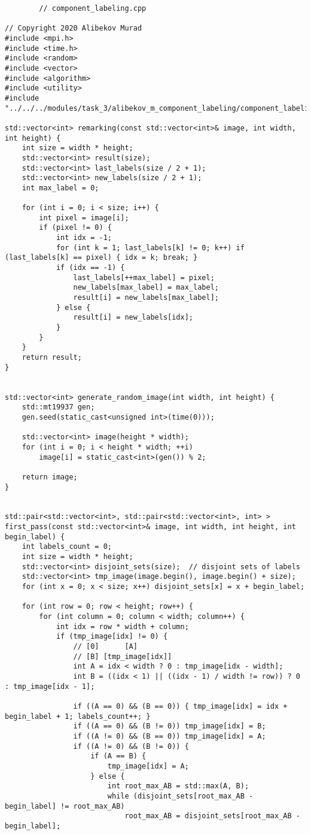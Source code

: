 \documentclass{report}
\begin{document}
	\begin{lstlisting}
		// component_labeling.cpp

// Copyright 2020 Alibekov Murad
#include <mpi.h>
#include <time.h>
#include <random>
#include <vector>
#include <algorithm>
#include <utility>
#include "../../../modules/task_3/alibekov_m_component_labeling/component_labeling.h"

std::vector<int> remarking(const std::vector<int>& image, int width, int height) {
    int size = width * height;
    std::vector<int> result(size);
    std::vector<int> last_labels(size / 2 + 1);
    std::vector<int> new_labels(size / 2 + 1);
    int max_label = 0;

    for (int i = 0; i < size; i++) {
        int pixel = image[i];
        if (pixel != 0) {
            int idx = -1;
            for (int k = 1; last_labels[k] != 0; k++) if (last_labels[k] == pixel) { idx = k; break; }
            if (idx == -1) {
                last_labels[++max_label] = pixel;
                new_labels[max_label] = max_label;
                result[i] = new_labels[max_label];
            } else {
                result[i] = new_labels[idx];
            }
        }
    }
    return result;
}


std::vector<int> generate_random_image(int width, int height) {
    std::mt19937 gen;
    gen.seed(static_cast<unsigned int>(time(0)));

    std::vector<int> image(height * width);
    for (int i = 0; i < height * width; ++i)
        image[i] = static_cast<int>(gen()) % 2;

    return image;
}


std::pair<std::vector<int>, std::pair<std::vector<int>, int> >
first_pass(const std::vector<int>& image, int width, int height, int begin_label) {
    int labels_count = 0;
    int size = width * height;
    std::vector<int> disjoint_sets(size);  // disjoint sets of labels
    std::vector<int> tmp_image(image.begin(), image.begin() + size);
    for (int x = 0; x < size; x++) disjoint_sets[x] = x + begin_label;

    for (int row = 0; row < height; row++) {
        for (int column = 0; column < width; column++) {
            int idx = row * width + column;
            if (tmp_image[idx] != 0) {
                // [0]      [A]
                // [B] [tmp_image[idx]]
                int A = idx < width ? 0 : tmp_image[idx - width];
                int B = ((idx < 1) || ((idx - 1) / width != row)) ? 0 : tmp_image[idx - 1];

                if ((A == 0) && (B == 0)) { tmp_image[idx] = idx + begin_label + 1; labels_count++; }
                if ((A == 0) && (B != 0)) tmp_image[idx] = B;
                if ((A != 0) && (B == 0)) tmp_image[idx] = A;
                if ((A != 0) && (B != 0)) {
                    if (A == B) {
                        tmp_image[idx] = A;
                    } else {
                        int root_max_AB = std::max(A, B);
                        while (disjoint_sets[root_max_AB - begin_label] != root_max_AB)
                            root_max_AB = disjoint_sets[root_max_AB - begin_label];


\end{lstlisting}
\end{document}

